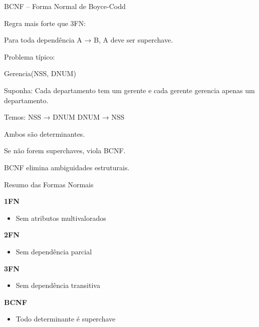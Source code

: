 \documentclass{beamer}
\begin{document}
\begin{frame}{BCNF – Forma Normal de Boyce-Codd}

Regra mais forte que 3FN:

Para toda dependência A → B,
A deve ser superchave.

Problema típico:

Gerencia(NSS, DNUM)

Suponha:
Cada departamento tem um gerente
e cada gerente gerencia apenas um departamento.

Temos:
NSS → DNUM
DNUM → NSS

Ambos são determinantes.

Se não forem superchaves,
viola BCNF.

BCNF elimina ambiguidades estruturais.

\end{frame}





\begin{frame}{Resumo das Formas Normais}

\textbf{1FN}
\begin{itemize}
    \item Sem atributos multivalorados
\end{itemize}

\textbf{2FN}
\begin{itemize}
    \item Sem dependência parcial
\end{itemize}

\textbf{3FN}
\begin{itemize}
    \item Sem dependência transitiva
\end{itemize}

\textbf{BCNF}
\begin{itemize}
    \item Todo determinante é superchave
\end{itemize}

\end{frame}
\end{document}
